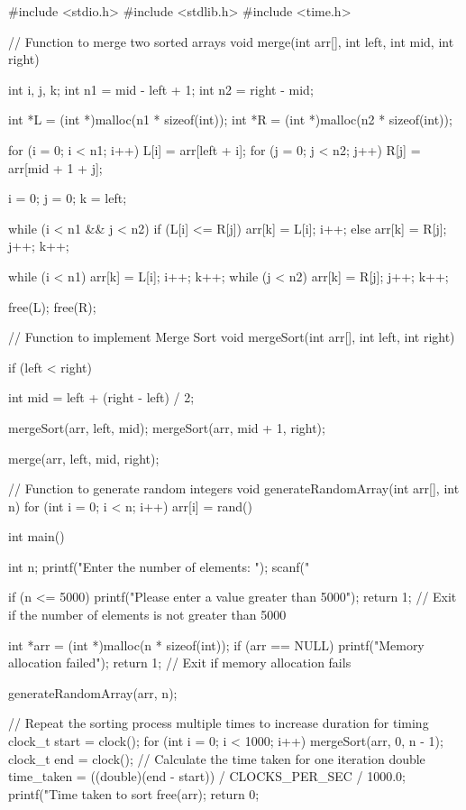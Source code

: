 #include <stdio.h> 
#include <stdlib.h> 
#include <time.h> 
 
// Function to merge two sorted arrays 
void merge(int arr[], int left, int mid, int right) 
{ 
    int i, j, k; 
    int n1 = mid - left + 1; 
    int n2 = right - mid; 
 
    int *L = (int *)malloc(n1 * sizeof(int)); 
    int *R = (int *)malloc(n2 * sizeof(int)); 
 
    for (i = 0; i < n1; i++) 
        L[i] = arr[left + i]; 
    for (j = 0; j < n2; j++) 
        R[j] = arr[mid + 1 + j]; 
 
    i = 0; 
    j = 0; 
    k = left; 
 
    while (i < n1 && j < n2) 
    { 
        if (L[i] <= R[j]) 
        { 
            arr[k] = L[i]; 
            i++; 
        } 
        else 
        { 
            arr[k] = R[j]; 
            j++; 
        } 
        k++; 
    } 
 
    while (i < n1) 
    { 
        arr[k] = L[i]; 
        i++; 
        k++; 
    } 
   while (j < n2) 
    { 
        arr[k] = R[j]; 
        j++; 
        k++; 
    } 
 
    free(L); 
    free(R); 
} 
 
// Function to implement Merge Sort 
void mergeSort(int arr[], int left, int right) 
{ 
    if (left < right) 
    { 
        int mid = left + (right - left) / 2; 
 
        mergeSort(arr, left, mid); 
        mergeSort(arr, mid + 1, right); 
 
        merge(arr, left, mid, right); 
    } 
} 
 
// Function to generate random integers 
void generateRandomArray(int arr[], int n) 
{ 
    for (int i = 0; i < n; i++) 
        arr[i] = rand() %
} 
 
int main() 
{ 
    int n; 
    printf("Enter the number of elements: "); 
    scanf("%
 
    if (n <= 5000) 
    { 
        printf("Please enter a value greater than 5000\n"); 
        return 1; // Exit if the number of elements is not greater than 5000 
    } 
 
    int *arr = (int *)malloc(n * sizeof(int)); 
    if (arr == NULL) 
    { 
        printf("Memory allocation failed\n"); 
        return 1; // Exit if memory allocation fails 
    } 
 
    generateRandomArray(arr, n); 
 
    // Repeat the sorting process multiple times to increase duration for timing 
clock_t start = clock(); 
for (int i = 0; i < 1000; i++) 
{ 
mergeSort(arr, 0, n - 1); 
} 
clock_t end = clock(); 
// Calculate the time taken for one iteration 
double time_taken = ((double)(end - start)) / CLOCKS_PER_SEC / 1000.0; 
printf("Time taken to sort %
free(arr); 
return 0; 
}


